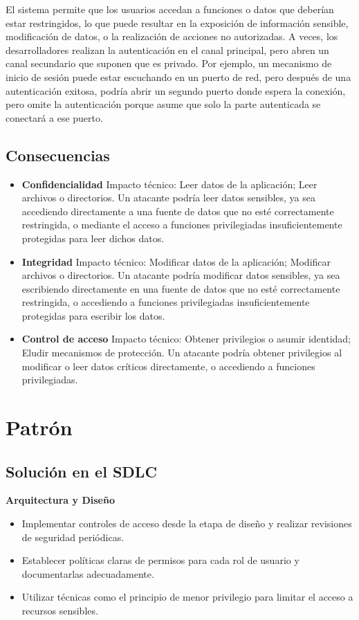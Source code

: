 El sistema permite que los usuarios accedan a funciones o datos que deberían estar restringidos, lo que puede resultar en la exposición de información sensible, modificación de datos, o la realización de acciones no autorizadas. A veces, los desarrolladores realizan la autenticación en el canal principal, pero abren un canal secundario que suponen que es privado. Por ejemplo, un mecanismo de inicio de sesión puede estar escuchando en un puerto de red, pero después de una autenticación exitosa, podría abrir un segundo puerto donde espera la conexión, pero omite la autenticación porque asume que solo la parte autenticada se conectará a ese puerto.

\subsection{Consecuencias}
\begin{itemize} 
\item \textbf{Confidencialidad}
Impacto técnico: Leer datos de la aplicación; Leer archivos o directorios.
Un atacante podría leer datos sensibles, ya sea accediendo directamente a una fuente de datos que no esté correctamente restringida, o mediante el acceso a funciones privilegiadas insuficientemente protegidas para leer dichos datos.

\item \textbf{Integridad}
Impacto técnico: Modificar datos de la aplicación; Modificar archivos o directorios.
Un atacante podría modificar datos sensibles, ya sea escribiendo directamente en una fuente de datos que no esté correctamente restringida, o accediendo a funciones privilegiadas insuficientemente protegidas para escribir los datos.

\item \textbf{Control de acceso}
Impacto técnico: Obtener privilegios o asumir identidad; Eludir mecanismos de protección.
Un atacante podría obtener privilegios al modificar o leer datos críticos directamente, o accediendo a funciones privilegiadas.
\end{itemize}

\section{Patrón}

\subsection{Solución en el SDLC} \textbf{Arquitectura y Diseño} \begin{itemize} \item Implementar controles de acceso desde la etapa de diseño y realizar revisiones de seguridad periódicas. \item Establecer políticas claras de permisos para cada rol de usuario y documentarlas adecuadamente. \item Utilizar técnicas como el principio de menor privilegio para limitar el acceso a recursos sensibles. \end{itemize}


